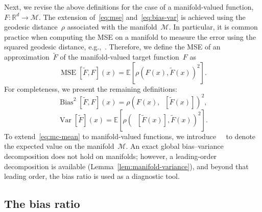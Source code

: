 \documentclass[12pt]{article}
\newcommand{\E}{{\mathbb{E}}}
\newcommand{\EM}{\mathop{\mathbb{E}_\M}}
\newcommand{\R}{\mathbb{R}}
\newcommand{\M}{\mathcal{M}}
\DeclareMathOperator{\mse}{MSE}
\newcommand{\bias}{\operatorname{Bias}^2}
\DeclareMathOperator{\var}{Var}
\begin{document}
Next, we revise the above definitions for the case of a manifold-valued function, $F \colon \R^d \to \M$. The extension of~\eqref{eq:mse} and~\eqref{eq:bias-var} is achieved using the geodesic distance~$\rho$ associated with the manifold~$\M$. In particular, it is common practice when computing the MSE on a manifold to measure the error using the squared geodesic distance, e.g.,~\cite{jermyn2005invariant}. Therefore, we define the MSE of an approximation~$\widetilde{F}$ of the manifold-valued target function~$F$ as
\begin{equation}\label{eq:mse-manifold}
   \mse[\widetilde{F},F](x) = \E \left[ \rho(F(x), \widetilde{F}(x))^2 \right].
\end{equation}
For completeness, we present the remaining definitions:
\begin{equation} \label{eq:bias-manifold}
\bias[\widetilde{F},F](x) = \rho\left(F(x), \EM[\widetilde{F}(x)]\right) ^2,
\end{equation}
\begin{equation} \label{eq:var-manifold}
\var[\widetilde{F}](x) = \E\left[\rho\left(\EM[\widetilde{F}(x)], \widetilde{F}(x)\right)^2\right].
\end{equation}
To extend~\eqref{eq:mc-mean} to manifold-valued functions, we introduce~$\EM$ to denote the expected value on the manifold~$\M$. An exact global bias--variance decomposition does not hold on manifolds; however, a leading-order decomposition is available (Lemma~\ref{lem:manifold-variance}), and beyond that leading order, the bias ratio is used as a diagnostic tool.

\subsection{The bias ratio}\label{sec:bias-ratio}
\end{document}
